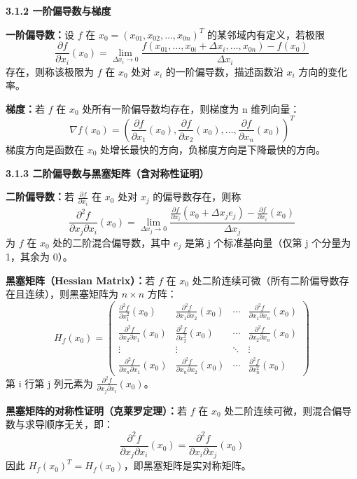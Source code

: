 \documentclass[10pt]{article}
\numberwithin{equation}{section}
\theoremstyle{plain}
\theoremstyle{definition}
\theoremstyle{remark}
\begin{document}
\textbf{3.1.2 一阶偏导数与梯度}

\textbf{一阶偏导数：}设 $f$ 在 $x_0=(x_{01},x_{02},\ldots,x_{0n})^T$ 的某邻域内有定义，若极限
\[\frac{\partial f}{\partial x_i}(x_0)=\lim_{\Delta x_i\to 0}\frac{f(x_{01},\ldots,x_{0i}+\Delta x_i,\ldots,x_{0n})-f(x_0)}{\Delta x_i}\]
存在，则称该极限为 $f$ 在 $x_0$ 处对 $x_i$ 的一阶偏导数，描述函数沿 $x_i$ 方向的变化率。

\textbf{梯度：}若 $f$ 在 $x_0$ 处所有一阶偏导数均存在，则梯度为 n 维列向量：
\[\nabla f(x_0)=\left(\frac{\partial f}{\partial x_1}(x_0),\frac{\partial f}{\partial x_2}(x_0),\ldots,\frac{\partial f}{\partial x_n}(x_0)\right)^T\]
梯度方向是函数在 $x_0$ 处增长最快的方向，负梯度方向是下降最快的方向。

\textbf{3.1.3 二阶偏导数与黑塞矩阵（含对称性证明）}

\textbf{二阶偏导数：}若 $\frac{\partial f}{\partial x_i}$ 在 $x_0$ 处对 $x_j$ 的偏导数存在，则称
\[\frac{\partial^2 f}{\partial x_j\partial x_i}(x_0)=\lim_{\Delta x_j\to 0}\frac{\frac{\partial f}{\partial x_i}(x_0+\Delta x_j e_j)-\frac{\partial f}{\partial x_i}(x_0)}{\Delta x_j}\]
为 $f$ 在 $x_0$ 处的二阶混合偏导数，其中 $e_j$ 是第 j 个标准基向量（仅第 j 个分量为 1，其余为 0）。

\textbf{黑塞矩阵（Hessian Matrix）：}若 $f$ 在 $x_0$ 处二阶连续可微（所有二阶偏导数存在且连续），则黑塞矩阵为 $n\times n$ 方阵：
\[H_f(x_0)=\begin{pmatrix}
		\frac{\partial^2 f}{\partial x_1^2}(x_0)           & \frac{\partial^2 f}{\partial x_1\partial x_2}(x_0) & \cdots & \frac{\partial^2 f}{\partial x_1\partial x_n}(x_0) \\
		\frac{\partial^2 f}{\partial x_2\partial x_1}(x_0) & \frac{\partial^2 f}{\partial x_2^2}(x_0)           & \cdots & \frac{\partial^2 f}{\partial x_2\partial x_n}(x_0) \\
		\vdots                                             & \vdots                                             & \ddots & \vdots                                             \\
		\frac{\partial^2 f}{\partial x_n\partial x_1}(x_0) & \frac{\partial^2 f}{\partial x_n\partial x_2}(x_0) & \cdots & \frac{\partial^2 f}{\partial x_n^2}(x_0)
	\end{pmatrix}\]
第 i 行第 j 列元素为 $\frac{\partial^2 f}{\partial x_j\partial x_i}(x_0)$。

\textbf{黑塞矩阵的对称性证明（克莱罗定理）：}若 $f$ 在 $x_0$ 处二阶连续可微，则混合偏导数与求导顺序无关，即：
\[\frac{\partial^2 f}{\partial x_j\partial x_i}(x_0)=\frac{\partial^2 f}{\partial x_i\partial x_j}(x_0)\]
因此 $H_f(x_0)^T=H_f(x_0)$，即黑塞矩阵是实对称矩阵。
\end{document}
